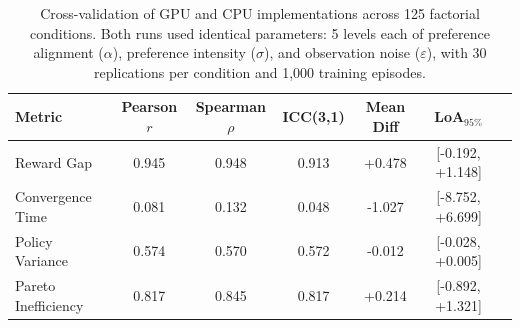 \begin{table}[htbp]
\centering
\caption{Cross-validation of GPU and CPU implementations across 125 factorial conditions. Both runs used identical parameters: 5 levels each of preference alignment ($\alpha$), preference intensity ($\sigma$), and observation noise ($\varepsilon$), with 30 replications per condition and 1{,}000 training episodes.}
\label{tab:cross-validation-summary}
\begin{tabular}{lcccccc}
\toprule
Metric & Pearson $r$ & Spearman $\rho$ & ICC(3,1) & Mean Diff & LoA$_{95\%}$ \\
\midrule
Reward Gap & 0.945 & 0.948 & 0.913 & +0.478 & [-0.192, +1.148] \\
Convergence Time & 0.081 & 0.132 & 0.048 & -1.027 & [-8.752, +6.699] \\
Policy Variance & 0.574 & 0.570 & 0.572 & -0.012 & [-0.028, +0.005] \\
Pareto Inefficiency & 0.817 & 0.845 & 0.817 & +0.214 & [-0.892, +1.321] \\
\bottomrule
\end{tabular}
\end{table}